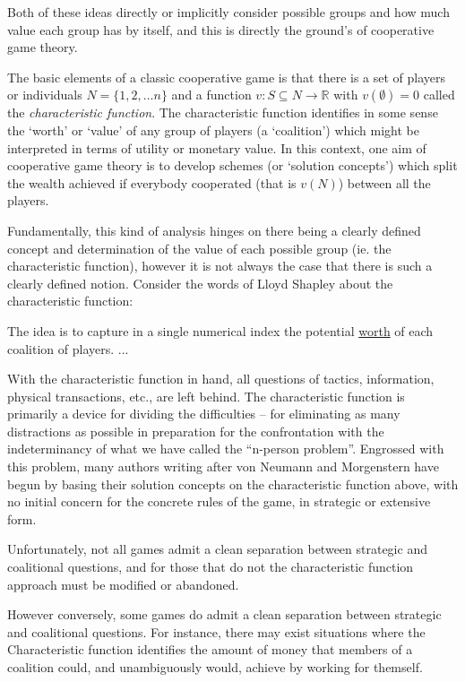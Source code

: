 Both of these ideas directly or implicitly consider possible groups and how much value each group has by itself, and this is directly the ground's of cooperative game theory.

The basic elements of a classic cooperative game is that there is a set of players or individuals $N=\{1,2,\dots n\}$ and a function $v: S\subseteq N \rightarrow \mathbb{R}$ with $v(\emptyset)=0$ called the \textit{characteristic function}.
The characteristic function identifies in some sense the `worth' or `value' of any group of players (a `coalition') which might be interpreted in terms of utility or monetary value.
In this context, one aim of cooperative game theory is to develop schemes (or `solution concepts') which split the wealth achieved if everybody cooperated (that is $v(N)$) between all the players.

Fundamentally, this kind of analysis hinges on there being a clearly defined concept and determination of the value of each possible group (ie. the characteristic function), however it is not always the case that there is such a clearly defined notion.
Consider the words of Lloyd Shapley about the characteristic function:

\begin{displayquote}
The idea is to capture in a single numerical index the potential \underline{worth} of each coalition of players.
...

With the characteristic function in hand, all questions of tactics, information, physical transactions, etc., are left behind. The characteristic function is primarily a device for dividing the difficulties -- for eliminating as many distractions as possible in preparation for the confrontation with the indeterminancy of what we have called the ``n-person problem''. Engrossed with this problem, many authors writing after von Neumann and Morgenstern have begun by basing their solution concepts on the characteristic function above, with no initial concern for the concrete rules of the game, in strategic or extensive form.

Unfortunately, not all games admit a clean separation between strategic and coalitional questions, and for those that do not the characteristic function approach must be modified or abandoned.\cite{ShapleySchubikCharacteristicFunction}
\end{displayquote}

However conversely, some games do admit a clean separation between strategic and coalitional questions.
For instance, there may exist situations where the Characteristic function identifies the amount of money that members of a coalition could, and unambiguously would, achieve by working for themself.

